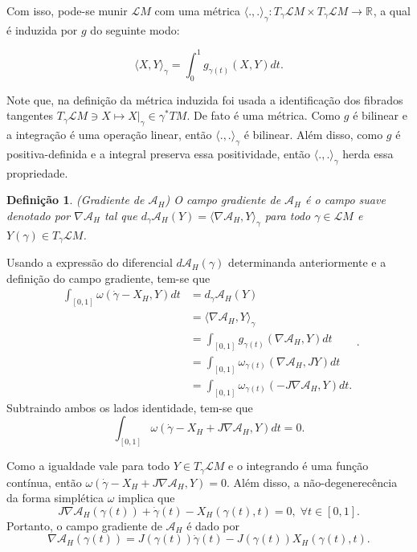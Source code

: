 \documentclass[12pt]{book}
\newtheorem{definicao}[teorema]{Definição}
\newcommand{\campohamiltoniano}[1]{X_{H}(#1)}
\newcommand{\campohamiltonianoabrev}{X_{H}}
\newcommand{\espacotangenteponto}[2]{T_{#1}#2}
\newcommand{\funcionalH}{\mathcal{A}_{H}}
\newcommand{\funcionalHponto}[1]{\mathcal{A}_{H}(#1)}
\newcommand{\gradientefuncional}{\nabla \funcionalH}
\newcommand{\iprod}[2]{\langle #1, #2 \rangle}
\newcommand{\intervalo}{[0,1]}
\newcommand{\produtointerno}[2]{\langle #1, #2 \rangle}
\newcommand{\pullbackfibradotangente}[2]{#1^{*}T#2}
\newcommand{\real}[1]{\mathbb{R}^{#1}}
\newcommand{\reta}{\real{}}
\newcommand{\lacocontrateis}{\mathcal{L}M}
\begin{document}
	Com isso, pode-se munir $\lacocontrateis$ com uma métrica $\produtointerno{.}{.}_{\gamma}: \espacotangenteponto{\gamma}{\lacocontrateis} \times \espacotangenteponto{\gamma}{\lacocontrateis} \to \reta$, a qual é induzida por $g$ do seguinte modo:
	
	$$
	\produtointerno{X}{Y}_{\gamma} = \int_{0}^{1}g_{\gamma(t)}(X, Y)dt.
	$$
	
	Note que, na definição da métrica induzida foi usada a identificação dos fibrados tangentes $\espacotangenteponto{\gamma}{\lacocontrateis} \ni X \mapsto  X|_{\gamma} \in \pullbackfibradotangente{\gamma}{M}$. De fato é uma métrica. Como $g$ é bilinear e a integração é uma operação linear, então $\produtointerno{.}{.}_{\gamma}$ é bilinear. Além disso, como $g$ é positiva-definida e a integral preserva essa positividade, então $\produtointerno{.}{.}_{\gamma}$ herda essa propriedade.

	\begin{definicao}
		(Gradiente de $\funcionalH$) O campo gradiente de $\funcionalH$ é o campo suave denotado por $\gradientefuncional$ tal que $d_{\gamma}\funcionalH(Y) = \produtointerno{\gradientefuncional}{Y}_{\gamma}$ para todo $\gamma \in \lacocontrateis$ e $Y(\gamma) \in \espacotangenteponto{\gamma}{\lacocontrateis}$.
	\end{definicao}

	Usando a expressão do diferencial $d\funcionalHponto{\gamma}$ determinanda anteriormente e a definição do campo gradiente, tem-se que
	$$
	\begin{aligned}
	\int_{[0,1]} \omega(\dot{\gamma} - \campohamiltonianoabrev, Y)dt&=
	d_{\gamma}\funcionalH(Y)
	\\ 
	&= \iprod{\gradientefuncional}{Y}_{\gamma}
	\\
	&= \int_{[0,1]}g_{\gamma(t)}(\gradientefuncional, Y)dt
	\\
	&=\int_{[0,1]} \omega_{\gamma(t)}(\gradientefuncional, JY)dt
	\\
	&=\int_{[0,1]} \omega_{\gamma(t)}(-J\gradientefuncional, Y)dt.
	\end{aligned}.
	$$
	Subtraindo ambos os lados identidade, tem-se que
	$$
	\int_{[0,1]} \omega(\dot{\gamma} - \campohamiltonianoabrev + J\gradientefuncional, Y)dt = 0.
	$$
	
	Como a igualdade vale para todo $Y \in \espacotangenteponto{\gamma}{\lacocontrateis}$ e o integrando é uma função contínua, então $\omega(\dot{\gamma} - \campohamiltonianoabrev + J\gradientefuncional, Y)=0$. Além disso, a não-degenerecência da forma simplética $\omega$ implica que
	$$
	J\gradientefuncional(\gamma(t)) +\dot{\gamma}(t)-\campohamiltoniano{\gamma(t), t} = 0, \; \forall t \in \intervalo.
	$$
	Portanto, o campo gradiente de $\funcionalH$ é dado por
	$$
	\gradientefuncional(\gamma(t))= J(\gamma(t))\dot{\gamma}(t)-J(\gamma(t))\campohamiltoniano{\gamma(t), t}.
	$$
	
\end{document}
